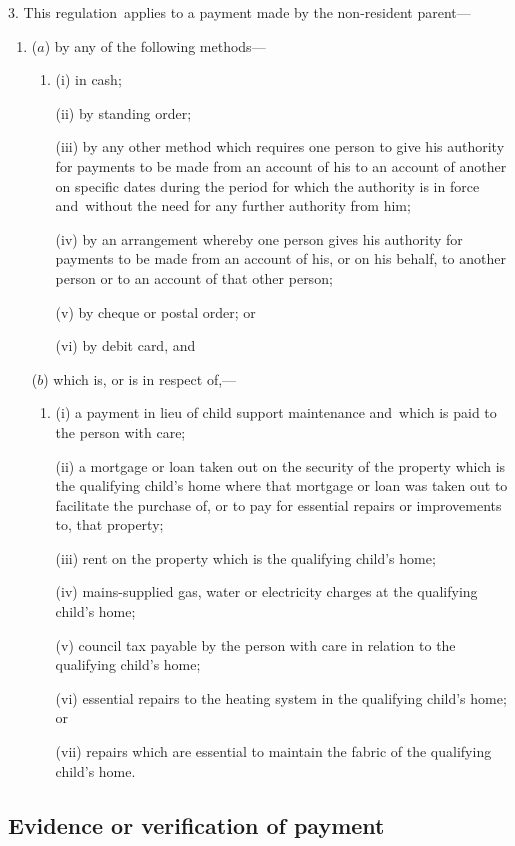 \documentclass[12pt,a4paper]{article}
\begin{document}
3.  This regulation~applies to a payment made by the non-resident parent—
\begin{enumerate}\item[]
($a$) by any of the following methods—
\begin{enumerate}\item[]
(i) in cash;

(ii) by standing order;

(iii) by any other method which requires one person to give his authority for payments to be made from an account of his to an account of another on specific dates during the period for which the authority is in force and~without the need for any further authority from him;

(iv) by an arrangement whereby one person gives his authority for payments to be made from an account of his, or on his behalf, to another person or to an account of that other person;

(v) by cheque or postal order; or

(vi) by debit card, and
\end{enumerate}

($b$) which is, or is in respect of,—
\begin{enumerate}\item[]
(i) a payment in lieu of child support maintenance and~which is paid to the person with care;

(ii) a mortgage or loan taken out on the security of the property which is the qualifying child’s home where that mortgage or loan was taken out to facilitate the purchase of, or to pay for essential repairs or improvements to, that property;

(iii) rent on the property which is the qualifying child’s home;

(iv) mains-supplied gas, water or electricity charges at the qualifying child’s home;

(v) council tax payable by the person with care in relation to the qualifying child’s home;

(vi) essential repairs to the heating system in the qualifying child’s home; or

(vii) repairs which are essential to maintain the fabric of the qualifying child’s home.
\end{enumerate}
\end{enumerate}

\subsection[4. Evidence or verification of payment]{Evidence or verification of payment}
\end{document}
